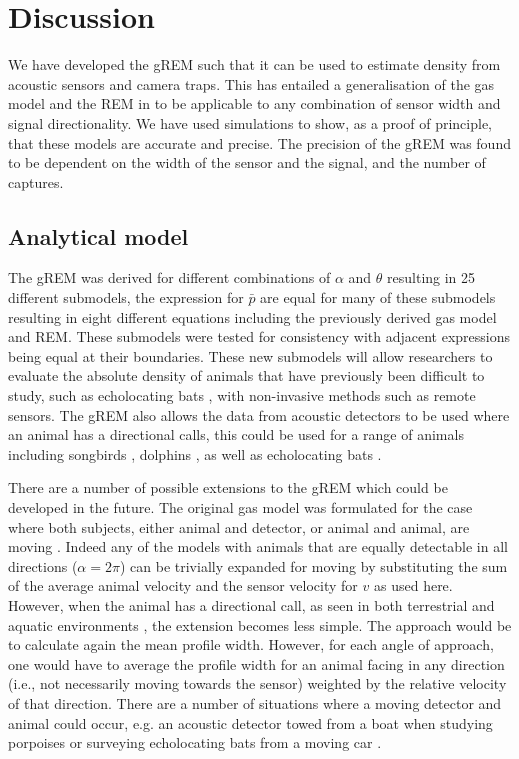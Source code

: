 \documentclass[a4paper,10pt,reqno,oneside]{amsart}
\begin{document}
                  
                  
\section*{Discussion}

We have developed the gREM such that it can be used to estimate density from acoustic sensors and camera traps. This has entailed a generalisation of the gas model and the REM in \citet{rowcliffe2008estimating} to be applicable to any combination of sensor width and signal directionality. We have used simulations to show, as a proof of principle, that these models are accurate and precise. The precision of the gREM was found to be dependent on the width of the sensor and the signal, and the number of captures.

\subsection*{Analytical model}
The gREM was derived for different combinations of $\alpha$ and $\theta$ resulting in 25 different submodels, the expression for $\bar{p}$ are equal for many of these submodels resulting in eight different equations including the previously derived gas model and REM. These submodels were tested for consistency with adjacent expressions being equal at their boundaries. These new submodels will allow researchers to evaluate the absolute density of animals that have previously been difficult to study, such as echolocating bats \citep{clement2013estimating}, with non-invasive methods such as remote sensors. The gREM also allows the data from acoustic detectors to be used where an animal has a directional calls, this could be used for a range of animals including songbirds \citep{blumstein2011acoustic}, dolphins \citep{lammers2003directionality}, as well as echolocating bats \citep{walters2013challenges}. 

There are a number of possible extensions to the gREM which could be developed in the future. The original gas model was formulated for the case where both subjects, either animal and detector, or animal and animal, are moving \citep{Hutchinson_Waser_2007}. Indeed any of the models with animals that are equally detectable in all directions ($\alpha = 2\pi$) can be trivially expanded for moving by substituting the sum of the average animal velocity and the sensor velocity for $v$ as used here. However, when the animal has a directional call, as seen in both terrestrial and aquatic environments \citep{lammers2003directionality,blumstein2011acoustic}, the extension becomes less simple. The approach would be to calculate again the mean profile width. However, for each angle of approach, one would have to average the profile width for an animal facing in any direction (i.e., not necessarily moving towards the sensor) weighted by the relative velocity of that direction. There are a number of situations where a moving detector and animal could occur, e.g. an acoustic detector towed from a boat when studying porpoises \citep{kimura2014acoustic} or surveying echolocating bats from a moving car \citep{ahlen1999use, jones2011indicator}. 
\end{document}
